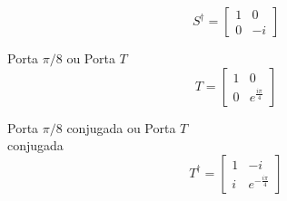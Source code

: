 \begin{enumerate}
\begin{minipage}{0.5\textwidth}
        $$
            S^{\dagger}=\left[\begin{array}{cc}
                 1 & 0 \\
                 0 & -i
            \end{array}\right]
        $$
    \end{minipage}
    \begin{minipage}{0.5\textwidth}
        \item Porta $\pi/8$ ou Porta $T$
        $$
            T=\left[\begin{array}{cc}
                 1 & 0 \\
                 0 & e^{\frac{i\pi}{4}}
            \end{array}\right]
        $$
    \end{minipage}
    \begin{minipage}{0.5\textwidth}
        \item Porta $\pi/8$ conjugada ou Porta $T$ \\   
        conjugada
        $$
            T^{\dagger}=\left[\begin{array}{cc}
                 1 & -i \\
                 i & e^{-\frac{i\pi}{4}}
            \end{array}\right]
        $$
    \end{minipage}
    \end{enumerate}

